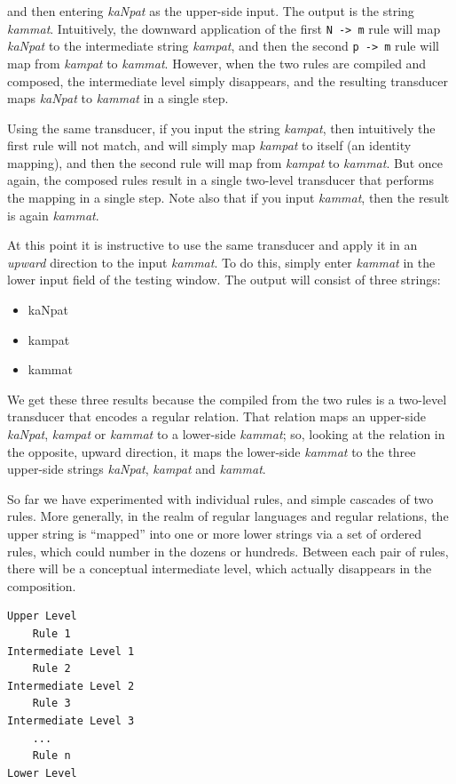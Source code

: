\noindent
and then entering \emph{kaNpat} as the upper-side input.  The output is the string
\emph{kammat}.  Intuitively, the downward application of the first \texttt{N ->
m} rule will map \emph{kaNpat} to the intermediate string \emph{kampat}, and then
the second \texttt{p -> m} rule will map from \emph{kampat} to \emph{kammat}.
However, when the two rules are compiled and composed, the
intermediate level simply disappears, and the resulting transducer maps \emph{kaNpat} to
\emph{kammat} in a single step.

Using the same transducer, if
you input the string \emph{kampat}, then intuitively the first rule will not match, and
will simply map \emph{kampat} to itself (an identity mapping), and then the second
rule will map from \emph{kampat} to \emph{kammat}.  But once again, the composed
rules result in a single two-level transducer that performs the mapping in a
single step.  Note also that if you input \emph{kammat}, then the result is again
\emph{kammat}.

At this point it is instructive to use the same transducer and apply it in an
\emph{upward} direction to the input \emph{kammat}.  To do this, simply enter
\emph{kammat} in the lower input field of the testing window.  The output will
consist of three strings:

\begin{itemize}
\item
kaNpat
\item
kampat
\item
kammat
\end{itemize}

\noindent
We get these three results because the \fst{} compiled from the two rules is a
two-level transducer that encodes a regular relation.  That relation maps an
upper-side \emph{kaNpat}, \emph{kampat} or \emph{kammat} to a lower-side
\emph{kammat}; so, looking at the relation in the opposite, upward direction, it maps the
lower-side \emph{kammat} to the three upper-side strings \emph{kaNpat}, \emph{kampat}
and \emph{kammat}.

So far we have experimented with individual rules, and simple cascades of two rules.
More generally, in the realm of regular languages and
regular relations, the upper string  is ``mapped'' into one or more 
lower strings via a set of ordered rules, which could number in the dozens or hundreds.  Between each
pair of rules, there will be a conceptual intermediate level, which
actually disappears in the composition.


\begin{Verbatim}
Upper Level
    Rule 1
Intermediate Level 1
    Rule 2
Intermediate Level 2
    Rule 3
Intermediate Level 3
    ...
    Rule n
Lower Level
\end{Verbatim}

